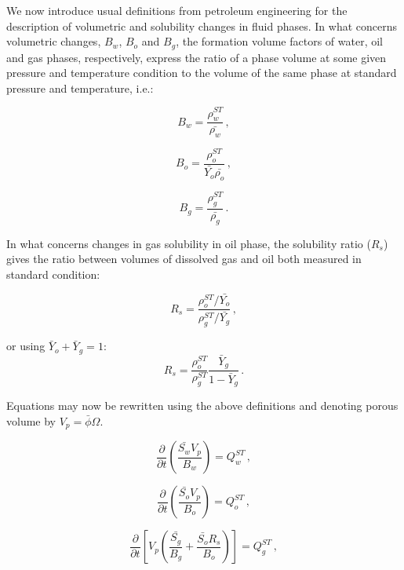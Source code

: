 \documentclass[authoryear,preprint,review,12pt]{elsarticle}
\begin{document}
We now introduce usual definitions from petroleum engineering for the description of volumetric and solubility changes in fluid phases. In what concerns volumetric changes, $B_w$, $B_o$ and $B_g$, the formation volume factors of water, oil and gas phases, respectively, express the ratio of a phase volume at some given pressure and temperature condition to the volume of the same phase at standard pressure and temperature, i.e.:

\begin{equation}\label{eq: Bw}
B_w = \frac{\rho_w^{ST}}{\bar{\rho_w}} \, ,
\end{equation}

\begin{equation}\label{eq: Bo}
B_o = \frac{\rho_o^{ST}}{\bar{Y_o} \bar{\rho_o}} \, ,
\end{equation}

\begin{equation}\label{eq: Bg}
B_g = \frac{\rho_g^{ST}}{\bar{\rho_g}} \, .
\end{equation}

In what concerns changes in gas solubility in oil phase, the solubility ratio ($R_s$) gives the ratio between volumes of dissolved gas and oil both measured in standard condition:

\begin{equation}
R_s = \frac{\rho_o^{ST} / \bar{Y_o}}{\rho_g^{ST} / \bar{Y_g}} \, ,
\end{equation}

or using $\bar{Y}_o + \bar{Y}_g = 1$:
\begin{equation}
R_s = \frac{\rho_o^{ST}}{\rho_g^{ST}}\frac{\bar{Y}_g}{1-\bar{Y}_g} \, .
\end{equation}

Equations may now be rewritten using the above definitions and denoting porous volume by $V_p = \bar{\phi}\Omega$.

\begin{equation}\label{eq: Sw4}
\frac{\partial}{\partial t} \left(\frac{\bar{S_w} V_p}{B_w} \right) = Q_w^{ST} \, ,
\end{equation}

\begin{equation}\label{eq: So4}
\frac{\partial}{\partial t} \left(\frac{\bar{S_o} V_p}{B_o} \right) = Q_o^{ST} \, ,
\end{equation}

\begin{equation}\label{eq: Sg4}
\frac{\partial}{\partial t} \left[ V_p \left(\frac{\bar{S_g}}{B_g} + \frac{\bar{S_o} R_s}{B_o} \right) \right] = Q_g^{ST} \, ,
\end{equation}
\end{document}
